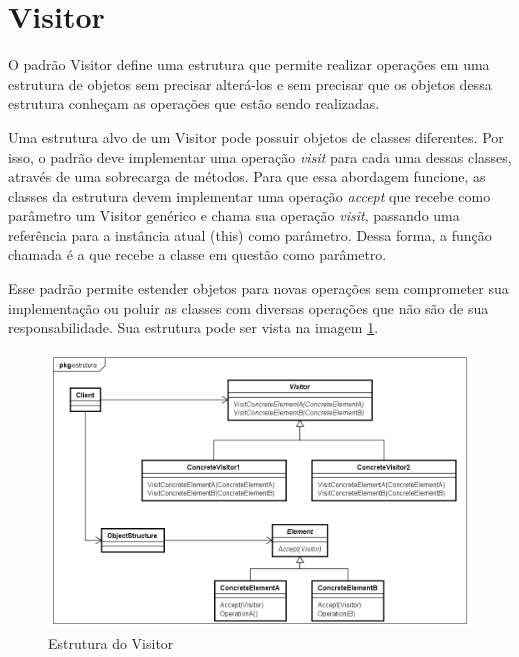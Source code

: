 \section{Visitor}

O padrão Visitor define uma estrutura que permite realizar 
operações em uma estrutura de objetos sem precisar alterá-los 
e sem precisar que os objetos dessa estrutura conheçam as 
operações que estão sendo realizadas. 

Uma estrutura alvo de um Visitor pode possuir objetos de 
classes diferentes. Por isso, o padrão deve implementar 
uma operação \textit{visit} para cada uma dessas classes, 
através de uma sobrecarga de métodos. Para que essa 
abordagem funcione, as classes da estrutura devem implementar 
uma operação \textit{accept} que recebe como parâmetro um 
Visitor genérico e chama sua operação \textit{visit}, 
passando uma referência para a instância atual (this) 
como parâmetro. Dessa forma, a função chamada é a 
que recebe a classe em questão como parâmetro.

Esse padrão permite estender objetos para novas operações 
sem comprometer sua implementação ou poluir as classes com 
diversas operações que não são de sua responsabilidade. 
Sua estrutura pode ser vista na imagem \ref{visitor_struct}.

\begin{figure}[htb]
	\caption{\label{visitor_struct}Estrutura do Visitor}
	\begin{center}
	    \includegraphics[scale=0.5]{5_padroes-contexto-funcional/5.3_comportamentais/5.3.11_visitor/visitor_estrutura.png}
	\end{center}
\end{figure}

